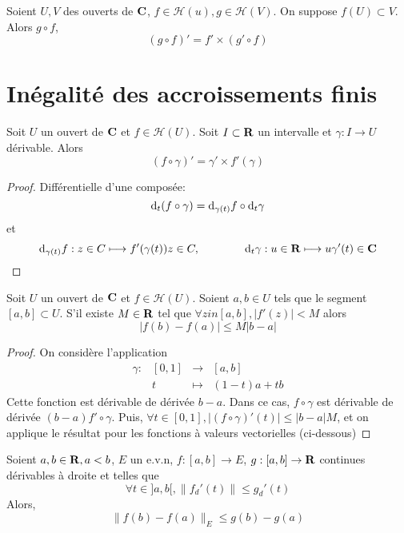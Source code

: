 \begin{prop}
    Soient $U, V$ des ouverts de  $\mathbf C$, $f \in  \mathcal  H(u), g \in  \mathcal  H(V)$. On suppose $f(U) \subset V$. Alors $g\circ f$,  \[
        (g\circ f)'=f'\times (g'\circ f)
    \] 
\end{prop}

\section{Inégalité des accroissements finis}

\begin{prop}
    Soit $U$ un ouvert de  $\mathbf C$ et $f \in  \mathcal  H(U)$. Soit $I\subset \mathbf R$ un intervalle et $\gamma:I\longrightarrow U$ dérivable. Alors \[
        (f\circ \gamma)'=\gamma'\times f'(\gamma)
    \] 
\end{prop}

\begin{proof}
Différentielle d'une composée: \[
    \mathop{}\!\mathrm d_t(f\circ \gamma)= \mathop{}\!\mathrm d_{\gamma(t)}f\circ \mathop{}\!\mathrm d_t \gamma
\] 
et \[
    \mathop{}\!\mathrm d_{\gamma(t)}f: z \in  C \longmapsto  f'(\gamma(t))z\in C, \qquad \qquad \mathop{}\!\mathrm d_t \gamma: u \in  \mathbf R \longmapsto u \gamma'(t) \in  \mathbf C
\] 
\end{proof}

\begin{thm}
    Soit $U$ un ouvert de  $\mathbf C$ et $f \in  \mathcal  H(U)$. Soient $a, b \in  U$ tels que le segment $[a, b]\subset U$. S'il existe  $M \in  \mathbf R$ tel que $\forall  z in [a, b], |f'(z)|<M$ alors \[
        |f(b)-f(a)|\leq M|b-a|
    \] 
\end{thm}

\begin{proof}
On considère l'application  \[
\begin{array}{rrcl}
    \gamma:& [0,1] & \longrightarrow & [a,b] \\
           & t & \longmapsto & \displaystyle (1-t)a+tb
\end{array}
\]
Cette fonction est dérivable de dérivée $b-a$. Dans ce cas,  $f\circ \gamma$ est dérivable de dérivée $(b-a)f'\circ \gamma$. Puis, $\forall t \in  [0,1], |(f\circ \gamma)'(t)|\leq |b-a|M$, et on applique le résultat pour les fonctions à valeurs vectorielles (ci-dessous)
\end{proof}

\begin{prop}
    Soient $a, b \in  \mathbf R, a<b$, $E$ un e.v.n,  $f:[a, b] \to  E$, $g:[a, b] \to \mathbf R$ continues dérivables à droite et telles que \[
        \forall  t \in  ]a, b[, \|f_d'(t)\|\leq g_d'(t)
    \]
Alors, \[
    \|f(b)-f(a)\|_E\leq g(b)-g(a)
\] 
\end{prop}

